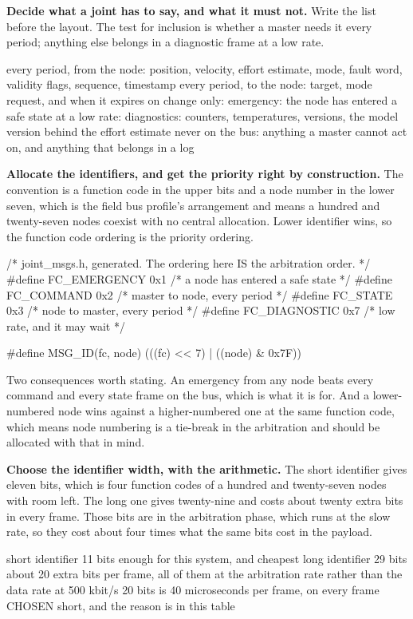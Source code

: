 \begin{steps}
\item \textbf{Decide what a joint has to say, and what it must not.} Write the
list before the layout. The test for inclusion is whether a master needs it
every period; anything else belongs in a diagnostic frame at a low rate.
\begin{plaincode}
every period, from the node:  position, velocity, effort estimate, mode,
                              fault word, validity flags, sequence, timestamp
every period, to the node:    target, mode request, and when it expires
on change only:               emergency: the node has entered a safe state
at a low rate:                diagnostics: counters, temperatures, versions,
                              the model version behind the effort estimate
never on the bus:             anything a master cannot act on, and anything
                              that belongs in a log
\end{plaincode}

\item \textbf{Allocate the identifiers, and get the priority right by
construction.} The convention is a function code in the upper bits and a node
number in the lower seven, which is the field bus profile's arrangement and
means a hundred and twenty-seven nodes coexist with no central allocation. Lower
identifier wins, so the function code ordering is the priority ordering.
\begin{ccode}
/* joint_msgs.h, generated. The ordering here IS the arbitration order. */
#define FC_EMERGENCY   0x1     /* a node has entered a safe state    */
#define FC_COMMAND     0x2     /* master to node, every period       */
#define FC_STATE       0x3     /* node to master, every period       */
#define FC_DIAGNOSTIC  0x7     /* low rate, and it may wait          */

#define MSG_ID(fc, node)  (((fc) << 7) | ((node) & 0x7F))
\end{ccode}
Two consequences worth stating. An emergency from any node beats every command
and every state frame on the bus, which is what it is for. And a lower-numbered
node wins against a higher-numbered one at the same function code, which means
node numbering is a tie-break in the arbitration and should be allocated with
that in mind.

\item \textbf{Choose the identifier width, with the arithmetic.} The short
identifier gives eleven bits, which is four function codes of a hundred and
twenty-seven nodes with room left. The long one gives twenty-nine and costs
about twenty extra bits in every frame. Those bits are in the arbitration phase,
which runs at the slow rate, so they cost about four times what the same bits
cost in the payload.
\begin{plaincode}
short identifier   11 bits   enough for this system, and cheapest
long identifier    29 bits   about 20 extra bits per frame, all of them at
                             the arbitration rate rather than the data rate
at 500 kbit/s      20 bits is 40 microseconds per frame, on every frame
CHOSEN             short, and the reason is in this table
\end{plaincode}


\end{steps}
